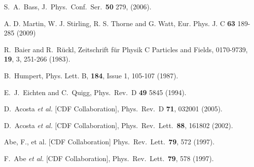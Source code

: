 \documentclass[article,showpacs,preprintnumbers,amsmath,amssymb]{revtex4}
\begin{document}
\begin{thebibliography}{80}
  S.~A.~Bass,
  J.\ Phys.\ Conf.\ Ser.\  {\bf 50} 279, (2006).

  A. D. Martin, W. J. Stirling, R. S. Thorne and G. Watt,
  Eur. Phys. J. C {\bf{63}}  189-285 (2009)

{
{R.~Baier and  R.~R{\"u}ckl},
{Zeitschrift f{\"u}r Physik C Particles and Fields},
{0170-9739},
{\bf{19}},
{3},
{251-266}
{(1983)}.
}

B.~Humpert, 
Phys. Lett. B, {\bf{184}}, Issue 1, 105-107 (1987).

  E.~J.~Eichten and C.~Quigg,
  Phys.\ Rev.\ D {\bf 49} 5845 (1994).

  D.~Acosta {\it et al.}  [CDF Collaboration],
  Phys.\ Rev.\ D {\bf 71}, 032001 (2005).

  D.~Acosta {\it et al.}  [CDF Collaboration],
  Phys.\ Rev.\ Lett.\  {\bf 88}, 161802 (2002).


  Abe, F., et al. [CDF Collaboration]
  Phys.\ Rev.\ Lett.\  {\bf 79}, 572 (1997). 

  F.~Abe {\it et al.}  [CDF Collaboration],
  Phys.\ Rev.\ Lett.\  {\bf 79}, 578 (1997).


\end{thebibliography}
\end{document}
